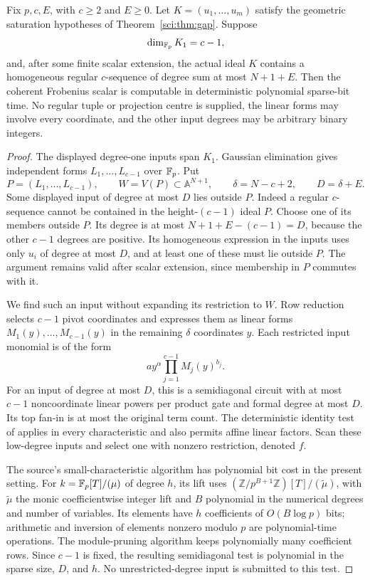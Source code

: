 \begin{theorem}
\label{sci:thm:linear-prefix}
Fix \(p,c,E\), with \(c\geq2\) and \(E\geq0\).
Let \(K=(u_1,\ldots,u_m)\)
satisfy the geometric saturation hypotheses of
Theorem~\ref{sci:thm:gap}. Suppose
\[
 \dim_{\mathbb F_p}K_1=c-1,
\]
and, after some finite scalar extension, the actual ideal \(K\)
contains a homogeneous regular \(c\)-sequence of degree sum at most
\(N+1+E\). Then the coherent Frobenius scalar is computable in
deterministic polynomial sparse-bit time. No regular tuple or projection
centre is supplied, the linear forms may involve every coordinate,
and the other input degrees may be arbitrary binary integers.
\end{theorem}
\begin{proof}
The displayed degree-one inputs span \(K_1\). Gaussian elimination
gives independent forms \(L_1,\ldots,L_{c-1}\) over \(\mathbb F_p\).
Put
\[
 P=(L_1,\ldots,L_{c-1}),\qquad W=V(P)\subset\mathbb A^{N+1},
 \qquad \delta=N-c+2,\qquad D=\delta+E.
\]
Some displayed input of degree at most \(D\) lies outside \(P\).
Indeed a regular \(c\)-sequence cannot be contained in the
height-\((c-1)\) ideal \(P\). Choose one of its members outside
\(P\). Its degree is at most \(N+1+E-(c-1)=D\), because the
other \(c-1\) degrees are positive. Its homogeneous expression in
the inputs uses only \(u_i\) of degree at most \(D\), and at least
one of these must lie outside \(P\). The argument remains valid after
scalar extension, since membership in \(P\) commutes with it.

We find such an input without expanding its restriction to \(W\).
Row reduction selects \(c-1\) pivot coordinates and expresses them
as linear forms \(M_1(y),\ldots,M_{c-1}(y)\) in the remaining
\(\delta\) coordinates \(y\). Each restricted input monomial is
of the form
\[
 a y^\alpha\prod_{j=1}^{c-1}M_j(y)^{b_j}.
\]
For an input of degree at most \(D\), this is a semidiagonal circuit
with at most \(c-1\) noncoordinate linear powers per product gate
and formal degree at most \(D\). Its top fan-in is at most the
original term count. The deterministic identity test of
\citet[Definition~1.1, Corollary~3.3, and \S6, especially
Theorems~6.3 and~6.5]{sci-sss} applies in every characteristic and
also permits affine linear factors. Scan these low-degree inputs and
select one with nonzero restriction, denoted \(f\).

The source's small-characteristic algorithm has polynomial bit cost
in the present setting. For \(k=\mathbb F_p[T]/(\mu)\) of degree \(h\),
its lift uses
\((\mathbb Z/p^{B+1}\mathbb Z)[T]/(\widetilde\mu)\), with
\(\widetilde\mu\) the monic coefficientwise integer lift and
\(B\) polynomial in the numerical degrees and number of variables.
Its elements have \(h\) coefficients of \(O(B\log p)\) bits;
arithmetic and inversion of elements nonzero modulo \(p\) are
polynomial-time operations. The module-pruning algorithm keeps
polynomially many coefficient rows. Since \(c-1\) is fixed, the
resulting semidiagonal test is polynomial in the sparse size, \(D\),
and \(h\). No unrestricted-degree input is submitted to this test.


\end{proof}
